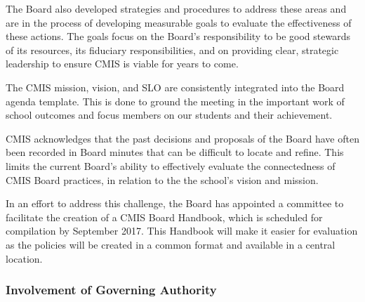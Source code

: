 \begin{findings}
The Board also developed strategies and procedures to address these areas and are in the process of developing measurable goals to evaluate the effectiveness of these actions. The goals focus on the Board’s responsibility to be good stewards of its resources, its fiduciary responsibilities, and on providing clear, strategic leadership to ensure CMIS is viable for years to come.

The CMIS mission, vision, and SLO are consistently integrated into the Board agenda template. This is done to ground the meeting in the important work of school outcomes and focus members on our students and their achievement. 


CMIS acknowledges that the past decisions and proposals of the Board have often been recorded in Board minutes that can be difficult to locate and refine. This limits the current Board’s ability to effectively evaluate the connectedness of CMIS Board practices, in relation to the the school’s vision and mission.

In an effort to address this challenge, the Board has appointed a committee to facilitate the creation of a CMIS Board Handbook, which is scheduled for compilation by September 2017. This Handbook will make it easier for evaluation as the policies will be created in a common format and available in a central location. 
\end{findings}

\subsubsection{Involvement of Governing Authority}



